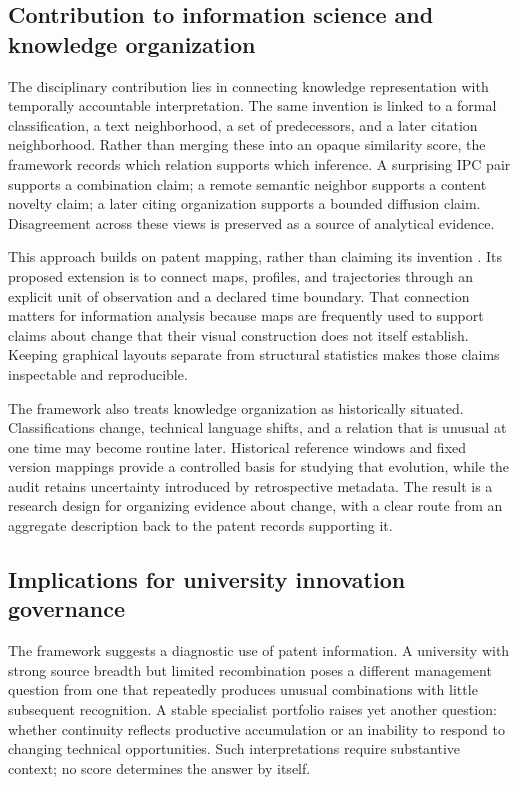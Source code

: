 \subsection{Contribution to information science and knowledge organization}
The disciplinary contribution lies in connecting knowledge representation with
temporally accountable interpretation. The same invention is linked to a formal
classification, a text neighborhood, a set of predecessors, and a later citation
neighborhood. Rather than merging these into an opaque similarity score, the
framework records which relation supports which inference. A surprising IPC pair
supports a combination claim; a remote semantic neighbor supports a content
novelty claim; a later citing organization supports a bounded diffusion claim.
Disagreement across these views is preserved as a source of analytical evidence.

This approach builds on patent mapping, rather than claiming its invention
\citep{kay2014,leydesdorff2014,yan2017}. Its proposed extension is to connect maps,
profiles, and trajectories through an explicit unit of observation and a declared
time boundary. That connection matters for information analysis because maps are
frequently used to support claims about change that their visual construction
does not itself establish. Keeping graphical layouts separate from structural
statistics makes those claims inspectable and reproducible.

The framework also treats knowledge organization as historically situated.
Classifications change, technical language shifts, and a relation that is unusual
at one time may become routine later. Historical reference windows and fixed
version mappings provide a controlled basis for studying that evolution, while
the audit retains uncertainty introduced by retrospective metadata. The result
is a research design for organizing evidence about change, with a clear route
from an aggregate description back to the patent records supporting it.

\subsection{Implications for university innovation governance}
The framework suggests a diagnostic use of patent information. A university with
strong source breadth but limited recombination poses a different management
question from one that repeatedly produces unusual combinations with little
subsequent recognition. A stable specialist portfolio raises yet another question:
whether continuity reflects productive accumulation or an inability to respond
to changing technical opportunities. Such interpretations require substantive
context; no score determines the answer by itself.

